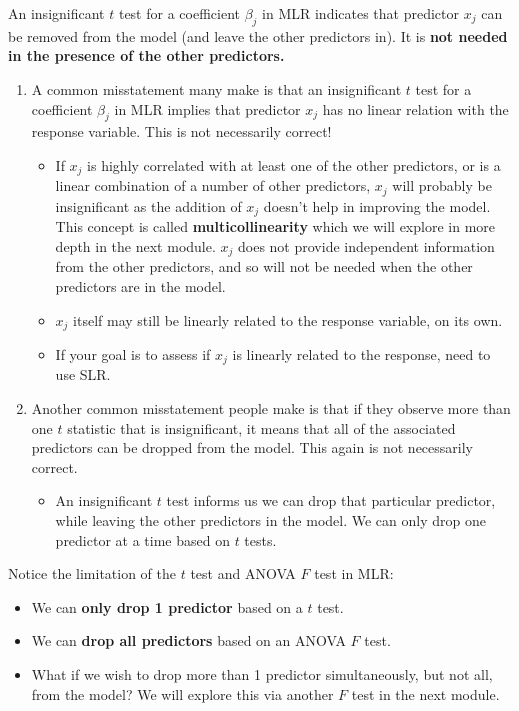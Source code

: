 \documentclass[
]{book}
\providecommand{\tightlist}{%
  \setlength{\itemsep}{0pt}\setlength{\parskip}{0pt}}
\begin{document}
An insignificant \(t\) test for a coefficient \(\beta_j\) in MLR indicates that predictor \(x_j\) can be removed from the model (and leave the other predictors in). It is \textbf{not needed in the presence of the other predictors.}

\begin{enumerate}
\def\labelenumi{\arabic{enumi}.}
\item
  A common misstatement many make is that an insignificant \(t\) test for a coefficient \(\beta_j\) in MLR implies that predictor \(x_j\) has no linear relation with the response variable. This is not necessarily correct!

  \begin{itemize}
  \item
    If \(x_j\) is highly correlated with at least one of the other predictors, or is a linear combination of a number of other predictors, \(x_j\) will probably be insignificant as the addition of \(x_j\) doesn't help in improving the model. This concept is called \textbf{multicollinearity} which we will explore in more depth in the next module. \(x_j\) does not provide independent information from the other predictors, and so will not be needed when the other predictors are in the model.
  \item
    \(x_j\) itself may still be linearly related to the response variable, on its own.
  \item
    If your goal is to assess if \(x_j\) is linearly related to the response, need to use SLR.
  \end{itemize}
\item
  Another common misstatement people make is that if they observe more than one \(t\) statistic that is insignificant, it means that all of the associated predictors can be dropped from the model. This again is not necessarily correct.

  \begin{itemize}
  \tightlist
  \item
    An insignificant \(t\) test informs us we can drop that particular predictor, while leaving the other predictors in the model. We can only drop one predictor at a time based on \(t\) tests.
  \end{itemize}
\end{enumerate}

Notice the limitation of the \(t\) test and ANOVA \(F\) test in MLR:

\begin{itemize}
\tightlist
\item
  We can \textbf{only drop 1 predictor} based on a \(t\) test.
\item
  We can \textbf{drop all predictors} based on an ANOVA \(F\) test.
\item
  What if we wish to drop more than 1 predictor simultaneously, but not all, from the model? We will explore this via another \(F\) test in the next module.
\end{itemize}
\end{document}

